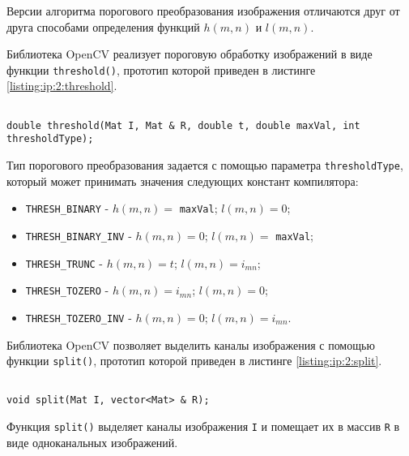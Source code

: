 Версии алгоритма порогового преобразования изображения отличаются друг от друга способами определения функций $h(m, n)$ и $l(m, n)$.

Библиотека OpenCV реализует пороговую обработку изображений в виде функции \linebreak \verb|threshold()|, прототип которой приведен в листинге \ref{listing:ip:2:threshold}.
\begin{lstlisting}

double threshold(Mat I, Mat & R, double t, double maxVal, int thresholdType);

\end{lstlisting}
\mylistingend

Тип порогового преобразования задается с помощью параметра \verb|thresholdType|, который может принимать значения следующих констант компилятора:

\begin{itemize}

	\item \verb|THRESH_BINARY| - $h(m, n) = $ \verb|maxVal|; $l(m, n) = 0$;
    \item \verb|THRESH_BINARY_INV| - $h(m, n) = 0$; $l(m, n) = $ \verb|maxVal|;
	\item \verb|THRESH_TRUNC| - $h(m, n) = t$; $l(m, n) = i_{mn}$;
    \item \verb|THRESH_TOZERO| - $h(m, n) = i_{mn}$; $l(m, n) = 0$;
	\item \verb|THRESH_TOZERO_INV| - $h(m, n) = 0$; $l(m, n) = i_{mn}$.

\end{itemize}


Библиотека OpenCV позволяет выделить каналы изображения с помощью функции \verb|split()|, прототип которой приведен в листинге \ref{listing:ip:2:split}.

\begin{lstlisting}

void split(Mat I, vector<Mat> & R);

\end{lstlisting}
\mylistingend

Функция \verb|split()| выделяет каналы изображения \verb|I| и помещает их в массив \verb|R| в виде одноканальных изображений.

